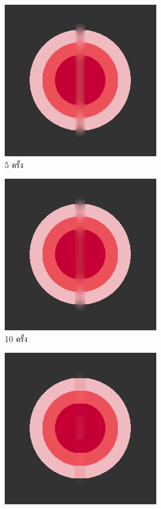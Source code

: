 

\begin{figure}[H]
    \centering
    \begin{subfigure}{0.4\linewidth}
        \centering
        \includegraphics[width=0.53\linewidth]{image/just10enough/only5time.png}
        \caption{5 ครั้ง}
    \end{subfigure}
    \begin{subfigure}{0.4\linewidth}
        \centering
        \includegraphics[width=0.53\linewidth]{image/just10enough/only10time.png}
        \caption{10 ครั้ง}
    \end{subfigure}
    \begin{subfigure}{0.4\linewidth}
        \centering
        \includegraphics[width=0.53\linewidth]{image/just10enough/only50time.png}			

\end{subfigure}
\end{figure}
